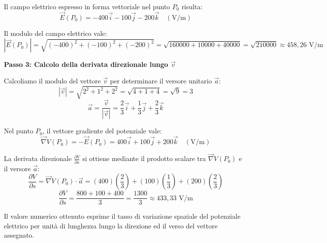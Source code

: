 \documentclass[12pt, a4paper]{article}
\begin{document}
	Il campo elettrico espresso in forma vettoriale nel punto $P_0$ risulta:
	\[
	\vec{E}(P_0) = -400 \vec{i} - 100 \vec{j} - 200 \vec{k} \quad (\text{V/m})
	\]
	
	Il modulo del campo elettrico vale:
	\[
	|\vec{E}(P_0)| = \sqrt{(-400)^2 + (-100)^2 + (-200)^2} = \sqrt{160000 + 10000 + 40000} = \sqrt{210000} \approx 458{,}26 \text{ V/m}
	\]
	
	\textbf{Passo 3: Calcolo della derivata direzionale lungo $\vec{v}$}
	
	Calcoliamo il modulo del vettore $\vec{v}$ per determinare il versore unitario $\vec{a}$:
	\[
	|\vec{v}| = \sqrt{2^2 + 1^2 + 2^2} = \sqrt{4 + 1 + 4} = \sqrt{9} = 3
	\]
	\[
	\vec{a} = \frac{\vec{v}}{|\vec{v}|} = \frac{2}{3}\vec{i} + \frac{1}{3}\vec{j} + \frac{2}{3}\vec{k}
	\]
	
	Nel punto $P_0$, il vettore gradiente del potenziale vale:
	\[
	\vec{\nabla}V(P_0) = -\vec{E}(P_0) = 400 \vec{i} + 100 \vec{j} + 200 \vec{k} \quad (\text{V/m})
	\]
	
	La derivata direzionale $\frac{\partial V}{\partial s}$ si ottiene mediante il prodotto scalare tra $\vec{\nabla}V(P_0)$ e il versore $\vec{a}$:
	\[
	\frac{\partial V}{\partial s} = \vec{\nabla}V(P_0) \cdot \vec{a} = (400)\left(\frac{2}{3}\right) + (100)\left(\frac{1}{3}\right) + (200)\left(\frac{2}{3}\right)
	\]
	\[
	\frac{\partial V}{\partial s} = \frac{800 + 100 + 400}{3} = \frac{1300}{3} \approx 433{,}33 \text{ V/m}
	\]
	
	Il valore numerico ottenuto esprime il tasso di variazione spaziale del potenziale elettrico per unità di lunghezza lungo la direzione ed il verso del vettore assegnato.
	
\end{document}
